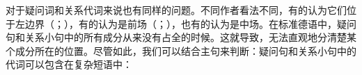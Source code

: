 对于疑问词和关系代词来说也有同样的问题。不同作者看法不同，有的认为它们位于左边界（\citealp{Kathol2001a}；\citealp[]{Eisenberg2004a}），有的认为是前场（\citealp[§1345]{Duden2005-Authors}；\citealp[--30, \S~3.1]{Woellstein2010a-u}），也有的认为是中场\citep[]{AH2004a-u}。在标准德语中，疑问句和关系小句中的所有成分从来没有占全的时候。这就导致，无法直观地分清楚某个成分所在的位置。尽管如此，我们可以结合主句来判断：疑问句和关系小句中的代词可以包含在复杂短语中：

